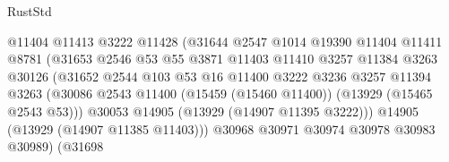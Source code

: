 \begin{lexlean}{RustStd}
\begin{coremodule}
                                        @11404
                                        @11413
                                        @3222
                                        @11428
                                        (@31644
                                          @2547
                                          @1014
                                          @19390
                                          @11404
                                          @11411
                                          @8781
                                          (@31653
                                            @2546
                                            @53
                                            @55
                                            @3871
                                            @11403
                                            @11410
                                            @3257
                                            @11384
                                            @3263
                                            @30126
                                            (@31652
                                              @2544
                                              @103
                                              @53
                                              @16
                                              @11400
                                              @3222
                                              @3236
                                              @3257
                                              @11394
                                              @3263
                                              (@30086
                                                @2543
                                                @11400
                                                (@15459 (@15460 @11400))
                                                (@13929 (@15465 @2543 @53)))
                                              @30053
                                              @14905
                                              (@13929 (@14907 @11395 @3222)))
                                            @14905
                                            (@13929 (@14907 @11385 @11403)))
                                          @30968
                                          @30971
                                          @30974
                                          @30978
                                          @30983
                                          @30989)
                                        (@31698

\end{coremodule}
\end{lexlean}
